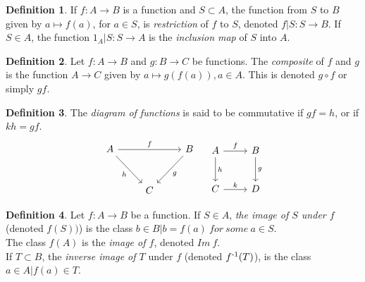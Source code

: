 \documentclass[a4paper,sfsidenotes,openany]{tufte-book}
\theoremstyle{definition}
\newtheorem{definition}{Definition}[section]
\begin{document}
\begin{fullwidth}
\begin{definition}
If $ f: A \rightarrow B $ is a function and $ S \subset A$, the function from $ S $ to $ B $ given by $ a \mapsto f(a) $, for $ a \in S $, is \textit{{\color{blue} restriction}} of $ f $ to $ S $, denoted $ f|S: S \rightarrow B$.\newline
If $ S \in A$, the function $ 1_A | S: S \rightarrow A $ is the \textit{{\color{blue} inclusion map}} of $S$ into $A$.\\
\end{definition}
\>

\begin{definition}
Let $ f: A \rightarrow B $ and $ g: B \rightarrow C $ be functions. The \textit{{\color{blue} composite}} of $ f $ and $ g $ is the function $ A \rightarrow C $ given by $ a \mapsto g(f(a)), a \in A $. This is denoted $ g \circ f $ or simply $ gf $.\\
\end{definition}
\>

\begin{definition}
The \textit{{\color{blue} diagram of functions}} is said to be commutative if $ gf = h $, or if $ kh = gf $.\\

\begin{equation}\label{diagram}
\begin{tikzcd}
A \arrow{rr}{f} \arrow[swap]{dr}{h} & & B \arrow{dl}{g} \\[10pt]
    & C
\end{tikzcd}
\quad
\begin{tikzcd}[row sep=2.5em]
 A \ar{r}{f} \ar{d}{h} & B \ar{d}{g} \\
 C \ar{r}{k} & D
\end{tikzcd}
\end{equation}
\end{definition}
\>

\begin{definition}
Let $ f: A \rightarrow B $ be a function. If $ S \in A $, \textit{{\color{blue} the image of $ S $ under $ f $}} (denoted $ f(S)) $) is the class $ { b \in B | b=f(a) \ for \ some \ a \in S} $.\\
The class $ f(A) $ is the \textit{{\color{blue} image of $ f $}}, denoted $ Im \ f $.\\
If $ T \subset B $, the \textit{{\color{blue} inverse image of $ T $}} under $ f $ (denoted $ f \textsuperscript{-1} (T) $), is the class $ { a \in A | f(a) \in T} $.\\
\end{definition}
\>


\end{fullwidth}
\end{document}
